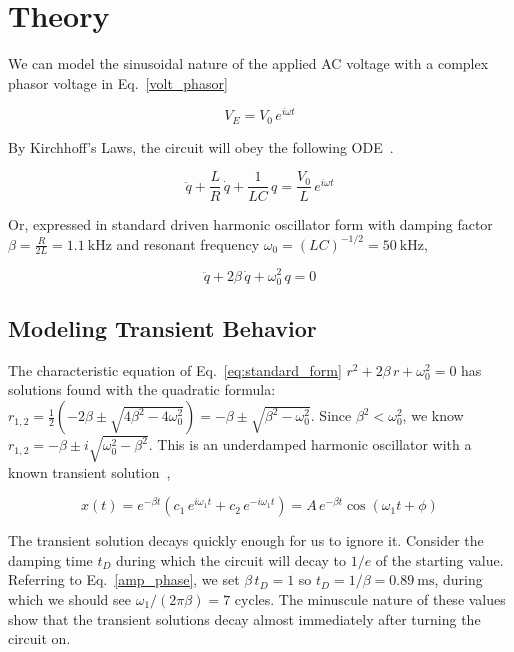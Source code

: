 \documentclass[11pt]{article}
\begin{document}
\section{Theory}\label{sec:theory}

We can model the sinusoidal nature of the applied AC voltage with a complex phasor voltage in Eq.~\eqref{volt_phasor}

\begin{equation}
  \label{volt_phasor}
V_E=V_{0}\,e^{i\omega t}
\end{equation}


By Kirchhoff's Laws, the circuit will obey the following ODE~\cite{gingrich}.

\begin{equation}
  \label{eq:ode}
  \ddot{q}+\frac{L}{R}\,\dot{q}+\frac{1}{LC}\,q=\frac{V_{0}}{L}\,e^{i\omega t}
\end{equation}

Or, expressed in standard driven harmonic oscillator form with damping factor $\beta=\frac{R}{2L}=\qty{1.1}{\kilo\hertz}$ and resonant frequency $\omega_{0}=(LC)^{-1/2}=\qty{50}{\kilo\hertz}$,

\begin{equation}
  \label{eq:standard_form}
  \ddot{q}+2\beta \,\dot{q}+\omega_{0}^{2}\,q=0
\end{equation}

\subsection{Modeling Transient Behavior}

The characteristic equation of Eq.~\eqref{eq:standard_form} $r^{2}+2\beta\,r+\omega_{0}^{2}=0$ has solutions found with the quadratic formula: $r_{1,2}=\frac{1}{2}(-2\beta\pm \sqrt{4\beta^{2}-4\omega_{0}^{2}})=-\beta\pm \sqrt{\beta^{2}-\omega_{0}^{2}}$. Since $\beta^{2}<\omega_{0}^{2}$, we know $r_{1,2}=-\beta\pm i\sqrt{\omega_{0}^{2}-\beta^{2}}$. This is an underdamped harmonic oscillator with a known transient solution~\cite{gingrich},

\begin{equation}
  \label{eq:transient}
  x(t) = e^{-\beta t}(c_{1}\,e^{i\omega_{1}t}+c_{2}\,e^{-i\omega_{1}t})=A\,e^{-\beta t}\cos(\omega_1 t + \phi)
\end{equation}

The transient solution decays quickly enough for us to ignore it. Consider the damping time $t_D$ during which the circuit will decay to $1/e$ of the starting value. Referring to Eq.~\eqref{amp_phase}, we set $\beta\,t_D=1$ so $t_D=1/\beta=\qty{0.89}{\milli\s}$, during which we should see $\omega_1 / (2\pi\beta)=7$ cycles. The minuscule nature of these values show that the transient solutions decay almost immediately after turning the circuit on. 
\end{document}
